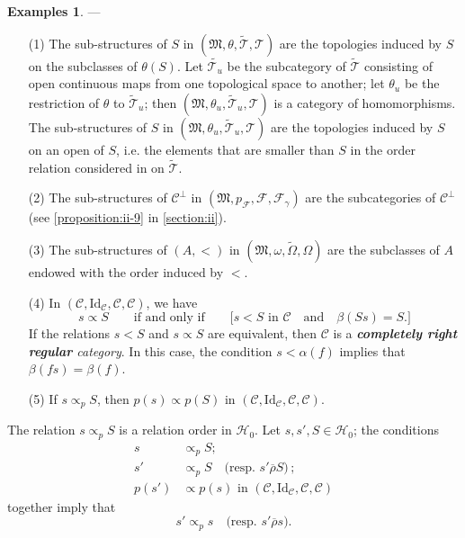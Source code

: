 \documentclass[a4paper,fleqn]{article}
\theoremstyle{plain}
\newenvironment{theorem}[1]
  {\renewcommand\theinnertheorem{#1}\innertheorem}
  {\endinnertheorem}
\theoremstyle{definition}
\newtheorem*{examples}{Examples}
\newcommand{\oldpage}[1]{{\marginpar{\footnotesize$\bigg\vert$\,\,\,\,\textit{p.~#1}}}}
\newcommand{\unsure}[1]{{\color{purple}\textbf{#1}}}
\newcommand{\textand}{\quad\text{and}\quad}
\newcommand{\CC}{\mathcal{C}}
\newcommand{\HH}{\mathcal{H}}
\newcommand{\MM}{\mathfrak{M}}
\newcommand{\FF}{\mathcal{F}}
\newcommand{\TT}{\mathcal{T}}
\newcommand{\tTT}{\widetilde{\TT}}
\newcommand{\relrhobar}{\mathrel{\overline{\rho}}}
\newcommand{\subs}{\mathrel{\propto}}
\newcommand{\Id}{\mathrm{Id}}
\begin{document}
\begin{examples}
  ---
  \begin{enumerate}
    \item[\normalfont(1)]
      The sub-structures of $S$ in $(\MM,\theta,\tTT,\TT)$ are the topologies induced by $S$ on the subclasses of $\theta(S)$.
      Let $\widetilde{\TT_u}$ be the subcategory of $\tTT$ consisting of open continuous maps from one topological space to another;
      let $\theta_u$ be the restriction of $\theta$ to $\tTT_u$;
      then $(\MM,\theta_u,\tTT_u,\TT)$ is a category of homomorphisms.
      The sub-structures of $S$ in $(\MM,\theta_u,\tTT_u,\TT)$ are the topologies induced by $S$ on an open of $S$, i.e. the elements that are smaller than $S$ in the order relation considered in \cite{3c} on $\tTT$.
    \item[\normalfont(2)]
      The sub-structures of $\CC^\perp$ in $(\MM,p_\FF,\FF,\FF_\gamma)$ are the subcategories of $\CC^\perp$ (see \cref{proposition:ii-9} in \cref{section:ii}).
    \item[\normalfont(3)]
      The sub-structures of $(A,<)$ in $(\MM,\omega,\widetilde{\Omega},\Omega)$ are the subclasses of $A$ endowed with the order induced by $<$.
    \item[\normalfont(4)]
      In $(\CC,\Id_\CC,\CC,\CC)$, we have
      \[
        s\subs S
        \qquad\text{if and only if}\qquad
        \big[
          \text{$s<S$ in $\CC$}
          \textand
          \beta(Ss)=S.
        \big]
      \]
      If the relations $s<S$ and $s\subs S$ are equivalent, then $\CC$ is a \emph{\unsure{completely right regular} category}.
      In this case, the condition $s<\alpha(f)$ implies that $\beta(fs)=\beta(f)$.
    \item[\normalfont(5)]
      If $s\subs_p S$, then $p(s)\subs p(S)$ in $(\CC,\Id_\CC,\CC,\CC)$.
  \end{enumerate}
\end{examples}

\begin{theorem}{1}
\label{theorem:i-1}
  \oldpage{362}
  The relation $s\subs_p S$ is a relation order in $\HH_0$.
  Let $s,s',S\in\HH_0$;
  the conditions
  \[
    \begin{aligned}
      s&\subs_p S;
    \\s'&\subs_p S
      \quad\text{(resp. $s'\relrhobar S$)}\,;
    \\p(s')&\subs p(s)\text{ in }(\CC,\Id_\CC,\CC,\CC)
    \end{aligned}
  \]
  together imply that
  \[
    s'\subs_p s
    \quad\text{(resp. $s'\relrhobar s$)}.
  \]
\end{theorem}
\end{document}
